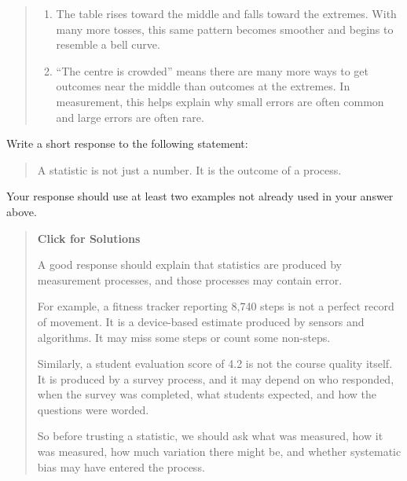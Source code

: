 \documentclass[
  letterpaper,
  DIV=11,
  numbers=noendperiod]{scrreprt}
\begin{document}
\begin{tcolorbox}
\begin{quote}
\begin{enumerate}
\def\labelenumi{\alph{enumi}.}
\setcounter{enumi}{1}
\item
  The table rises toward the middle and falls toward the extremes. With
  many more tosses, this same pattern becomes smoother and begins to
  resemble a bell curve.
\item
  ``The centre is crowded'' means there are many more ways to get
  outcomes near the middle than outcomes at the extremes. In
  measurement, this helps explain why small errors are often common and
  large errors are often rare.
\end{enumerate}
\end{quote}

\end{tcolorbox}

\begin{tcolorbox}[enhanced jigsaw, arc=.35mm, bottomrule=.15mm, bottomtitle=1mm, breakable, colback=white, colbacktitle=quarto-callout-note-color!10!white, colframe=quarto-callout-note-color-frame, coltitle=black, left=2mm, leftrule=.75mm, opacityback=0, opacitybacktitle=0.6, rightrule=.15mm, title=\textcolor{quarto-callout-note-color}{\faInfo}\hspace{0.5em}{Question 13}, titlerule=0mm, toprule=.15mm, toptitle=1mm]

Write a short response to the following statement:

\begin{quote}
A statistic is not just a number. It is the outcome of a process.
\end{quote}

Your response should use at least two examples not already used in your
answer above.

\begin{quote}
\textbf{Click for Solutions}

A good response should explain that statistics are produced by
measurement processes, and those processes may contain error.

For example, a fitness tracker reporting 8,740 steps is not a perfect
record of movement. It is a device-based estimate produced by sensors
and algorithms. It may miss some steps or count some non-steps.

Similarly, a student evaluation score of 4.2 is not the course quality
itself. It is produced by a survey process, and it may depend on who
responded, when the survey was completed, what students expected, and
how the questions were worded.

So before trusting a statistic, we should ask what was measured, how it
was measured, how much variation there might be, and whether systematic
bias may have entered the process.
\end{quote}

\end{tcolorbox}
\end{document}
